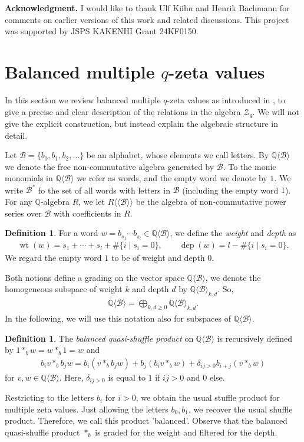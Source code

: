 \documentclass[12pt,reqno]{amsart}
\numberwithin{equation}{section}
\theoremstyle{definition}
\newtheorem{defi}[thm]{Definition}
\newcommand{\QQ}{\mathbb{Q}}
\newcommand{\Z}{\mathcal{Z}}
\newcommand{\wt}{\operatorname{wt}}
\newcommand{\dep}{\operatorname{dep}}
\newcommand{\B}{\mathcal{B}}
\newcommand{\QB}{\QQ\langle \B\rangle}
\newcommand{\RB}{R\langle\langle \B\rangle\rangle}
\begin{document}
\vspace{0,3cm}
\textbf{Acknowledgment.} I would like to thank Ulf Kühn and Henrik Bachmann for comments on earlier versions of this work and related discussions. This project was supported by JSPS KAKENHI Grant 24KF0150.

\section{Balanced multiple $q$-zeta values} \label{sec:balanced_qmzv}

In this section we review balanced multiple $q$-zeta values as introduced in \cite{Bu24}, to give a precise and clear description of the relations in the algebra $\Z_q$. We will not give the explicit construction, but instead explain the algebraic structure in detail.

Let $\B=\{b_0,b_1,b_2,\ldots\}$ be an alphabet, whose elements we call letters. By $\QB$ we denote the free non-commutative algebra generated by $\B$. To the monic monomials in $\QB$ we refer as words, and the empty word we denote by $1$. We write $\B^*$ fo the set of all words with letters in $\B$ (including the empty word $1$). For any $\QQ$-algebra $R$, we let $\RB$ be the algebra of non-commutative power series over $\B$ with coefficients in $R$.
\begin{defi} For a word $w=b_{s_1}\cdots b_{s_l}\in \QB$, we define the \emph{weight} and \emph{depth} as
\begin{align} \label{eq:wt_dep_QB}
\wt(w)=s_1+\cdots+s_l+\#\{i\mid s_i=0\}, \qquad \dep(w)=l-\#\{i\mid s_i=0\}.
\end{align}
We regard the empty word $1$ to be of weight and depth $0$.
\end{defi}
Both notions define a grading on the vector space $\QB$, we denote the homogeneous subspace of weight $k$ and depth $d$ by $\QB_{k,d}$. So,
\begin{align*}
\QB=\bigoplus_{k,d\geq0} \QB_{k,d}.
\end{align*}
In the following, we will use this notation also for subspaces of $\QB$.

\begin{defi} \label{def:bal_quasish}
The \emph{balanced quasi-shuffle product} on $\QB$ is recursively defined by $1\ast_b w=w\ast_b 1=w$ and 
\begin{align} \label{eq:bal_qsh}
	b_iv\ast_b b_jw=b_i(v\ast_b b_jw)+b_j(b_iv\ast_b w)+\delta_{ij>0} b_{i+j}(v\ast_b w)
\end{align}
for $v,w\in \QB$. Here, $\delta_{ij>0}$ is equal to $1$ if $ij>0$ and $0$ else. 
\end{defi}
Restricting to the letters $b_i$ for $i>0$, we obtain the usual stuffle product for multiple zeta values. Just allowing the letters $b_0,b_1$, we recover the usual shuffle product. Therefore, we call this product 'balanced'. Observe that the balanced quasi-shuffle product $\ast_b$ is graded for the weight and filtered for the depth.
\end{document}
